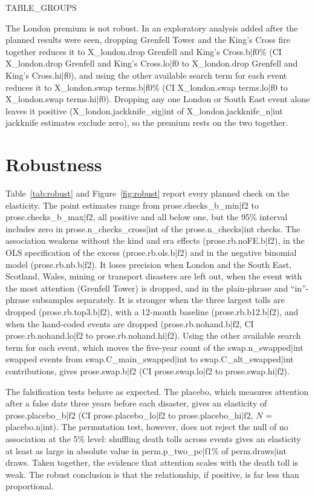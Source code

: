 \documentclass[11pt,a4paper]{article}
\begin{document}
{{TABLE_GROUPS}}

The London premium is not robust. In an exploratory analysis added after the planned results were seen, dropping Grenfell Tower and the King's Cross fire together reduces it to {{X_london.drop Grenfell and King's Cross.b|f0}}\% (CI {{X_london.drop Grenfell and King's Cross.lo|f0}} to {{X_london.drop Grenfell and King's Cross.hi|f0}}), and using the other available search term for each event reduces it to {{X_london.swap terms.b|f0}}\% (CI {{X_london.swap terms.lo|f0}} to {{X_london.swap terms.hi|f0}}). Dropping any one London or South East event alone leaves it positive ({{X_london.jackknife_sig|int}} of {{X_london.jackknife_n|int}} jackknife estimates exclude zero), so the premium rests on the two together.

\section{Robustness}
\label{sec:robust}
Table~\ref{tab:robust} and Figure~\ref{fig:robust} report every planned check on the elasticity. The point estimates range from {{prose.checks_b_min|f2}} to {{prose.checks_b_max|f2}}, all positive and all below one, but the 95\% interval includes zero in {{prose.n_checks_cross|int}} of the {{prose.n_checks|int}} checks. The association weakens without the kind and era effects ({{prose.rb.noFE.b|f2}}), in the OLS specification of the excess ({{prose.rb.ols.b|f2}}) and in the negative binomial model ({{prose.rb.nb.b|f2}}). It loses precision when London and the South East, Scotland, Wales, mining or transport disasters are left out, when the event with the most attention (Grenfell Tower) is dropped, and in the plain-phrase and ``in''-phrase subsamples separately. It is stronger when the three largest tolls are dropped ({{prose.rb.top3.b|f2}}), with a 12-month baseline ({{prose.rb.b12.b|f2}}), and when the hand-coded events are dropped ({{prose.rb.nohand.b|f2}}, CI {{prose.rb.nohand.lo|f2}} to {{prose.rb.nohand.hi|f2}}). Using the other available search term for each event, which moves the five-year count of the {{swap.n_swapped|int}} swapped events from {{swap.C_main_swapped|int}} to {{swap.C_alt_swapped|int}} contributions, gives {{prose.swap.b|f2}} (CI {{prose.swap.lo|f2}} to {{prose.swap.hi|f2}}).

The falsification tests behave as expected. The placebo, which measures attention after a false date three years before each disaster, gives an elasticity of {{prose.placebo_b|f2}} (CI {{prose.placebo_lo|f2}} to {{prose.placebo_hi|f2}}, $N$ = {{placebo.n|int}}). The permutation test, however, does not reject the null of no association at the 5\% level: shuffling death tolls across events gives an elasticity at least as large in absolute value in {{perm.p_two_pc|f1}}\% of {{perm.draws|int}} draws. Taken together, the evidence that attention scales with the death toll is weak. The robust conclusion is that the relationship, if positive, is far less than proportional.
\end{document}
